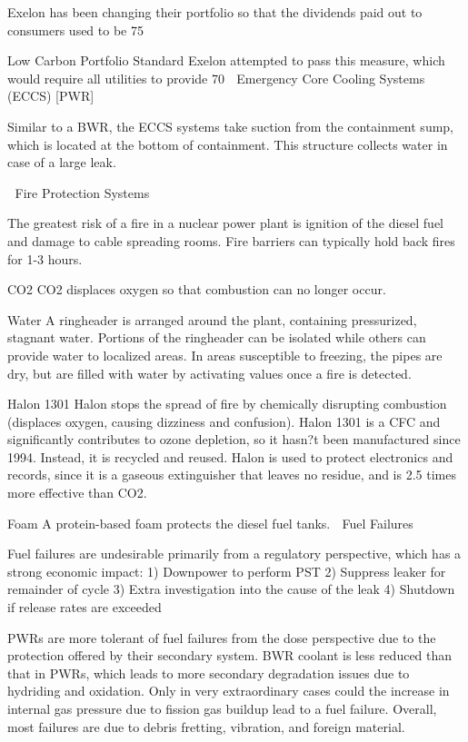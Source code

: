 \documentclass[10pt]{article}
\begin{document}
Exelon has been changing their portfolio so that the dividends paid out to consumers used to be 75%

Low Carbon Portfolio Standard
Exelon attempted to pass this measure, which would require all utilities to provide 70%

Emergency Core Cooling Systems (ECCS) [PWR]

Similar to a BWR, the ECCS systems take suction from the containment sump, which is located at the bottom of containment. This structure collects water in case of a large leak.  


Fire Protection Systems

The greatest risk of a fire in a nuclear power plant is ignition of the diesel fuel and damage to cable spreading rooms. Fire barriers can typically hold back fires for 1-3 hours. 

CO2
CO2 displaces oxygen so that combustion can no longer occur. 

Water
A ringheader is arranged around the plant, containing pressurized, stagnant water. Portions of the ringheader can be isolated while others can provide water to localized areas. In areas susceptible to freezing, the pipes are dry, but are filled with water by activating values once a fire is detected. 

Halon 1301
Halon stops the spread of fire by chemically disrupting combustion (displaces oxygen, causing dizziness and confusion). Halon 1301 is a CFC and significantly contributes to ozone depletion, so it hasn?t been manufactured since 1994. Instead, it is recycled and reused. Halon is used to protect electronics and records, since it is a gaseous extinguisher that leaves no residue, and is 2.5 times more effective than CO2. 

Foam
A protein-based foam protects the diesel fuel tanks. 

Fuel Failures

Fuel failures are undesirable primarily from a regulatory perspective, which has a strong economic impact:
1)	Downpower to perform PST
2)	Suppress leaker for remainder of cycle
3)	Extra investigation into the cause of the leak
4)	Shutdown if release rates are exceeded

PWRs are more tolerant of fuel failures from the dose perspective due to the protection offered by their secondary system. BWR coolant is less reduced than that in PWRs, which leads to more secondary degradation issues due to hydriding and oxidation. Only in very extraordinary cases could the increase in internal gas pressure due to fission gas buildup lead to a fuel failure. Overall, most failures are due to debris fretting, vibration, and foreign material. 
\end{document}
